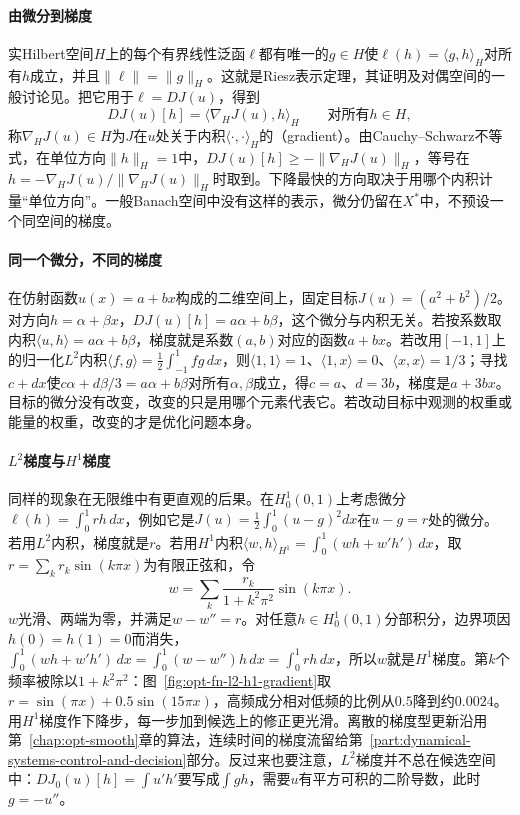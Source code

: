 \paragraph{由微分到梯度}
实Hilbert空间$H$上的每个有界线性泛函$\ell$都有唯一的$g\in H$使$\ell(h)=\langle g,h\rangle_H$对所有$h$成立，并且$\|\ell\|=\|g\|_H$。这就是Riesz表示定理，其证明及对偶空间的一般讨论见。把它用于$\ell=DJ(u)$，得到
\begin{equation}
 DJ(u)[h]=\langle\nabla_HJ(u),h\rangle_H\qquad\text{对所有}h\in H ,
 \label{eq:opt-fn-hilbert-gradient}
\end{equation}
称$\nabla_HJ(u)\in H$为$J$在$u$处关于内积$\langle\cdot,\cdot\rangle_H$的（gradient）。由Cauchy--Schwarz不等式，在单位方向$\|h\|_H=1$中，$DJ(u)[h]\ge-\|\nabla_HJ(u)\|_H$，等号在$h=-\nabla_HJ(u)/\|\nabla_HJ(u)\|_H$时取到。下降最快的方向取决于用哪个内积计量“单位方向”。一般Banach空间中没有这样的表示，微分仍留在$X^*$中，不预设一个同空间的梯度。

\paragraph{同一个微分，不同的梯度}
在仿射函数$u(x)=a+bx$构成的二维空间上，固定目标$J(u)=(a^2+b^2)/2$。对方向$h=\alpha+\beta x$，$DJ(u)[h]=a\alpha+b\beta$，这个微分与内积无关。若按系数取内积$\langle u,h\rangle=a\alpha+b\beta$，梯度就是系数$(a,b)$对应的函数$a+bx$。若改用$[-1,1]$上的归一化$L^2$内积$\langle f,g\rangle=\frac12\int_{-1}^1fg\,dx$，则$\langle1,1\rangle=1$、$\langle1,x\rangle=0$、$\langle x,x\rangle=1/3$；寻找$c+dx$使$c\alpha+d\beta/3=a\alpha+b\beta$对所有$\alpha,\beta$成立，得$c=a$、$d=3b$，梯度是$a+3bx$。目标的微分没有改变，改变的只是用哪个元素代表它。若改动目标中观测的权重或能量的权重，改变的才是优化问题本身。

\paragraph{$L^2$梯度与$H^1$梯度}
同样的现象在无限维中有更直观的后果。在$H_0^1(0,1)$上考虑微分$\ell(h)=\int_0^1rh\,dx$，例如它是$J(u)=\frac12\int_0^1(u-g)^2dx$在$u-g=r$处的微分。若用$L^2$内积，梯度就是$r$。若用$H^1$内积$\langle w,h\rangle_{H^1}=\int_0^1(wh+w'h')\,dx$，取$r=\sum_kr_k\sin(k\pi x)$为有限正弦和，令
\[
 w=\sum_k\frac{r_k}{1+k^2\pi^2}\sin(k\pi x) .
\]
$w$光滑、两端为零，并满足$w-w''=r$。对任意$h\in H_0^1(0,1)$分部积分，边界项因$h(0)=h(1)=0$而消失，$\int_0^1(wh+w'h')\,dx=\int_0^1(w-w'')h\,dx=\int_0^1rh\,dx$，所以$w$就是$H^1$梯度。第$k$个频率被除以$1+k^2\pi^2$：图~\ref{fig:opt-fn-l2-h1-gradient}取$r=\sin(\pi x)+0.5\sin(15\pi x)$，高频成分相对低频的比例从$0.5$降到约$0.0024$。用$H^1$梯度作下降步，每一步加到候选上的修正更光滑。离散的梯度型更新沿用第~\ref{chap:opt-smooth}章的算法，连续时间的梯度流留给第~\ref{part:dynamical-systems-control-and-decision}部分。反过来也要注意，$L^2$梯度并不总在候选空间中：$DJ_0(u)[h]=\int u'h'$要写成$\int gh$，需要$u$有平方可积的二阶导数，此时$g=-u''$。

